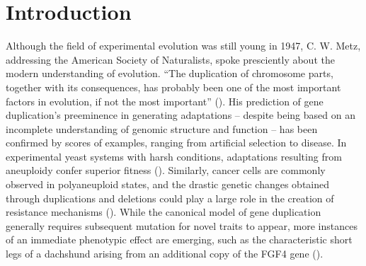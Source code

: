\section{Introduction} \label{sec:introduction}

Although the field of experimental evolution was still young in 1947, C. W. Metz, addressing the American Society of Naturalists, spoke presciently about the modern understanding of evolution. ``The duplication of chromosome parts, together with its consequences, has probably been one of the most important factors in evolution, if not the most important'' (\citep{Metz:chromosomeDuplication1947}).
His prediction of gene duplication's preeminence in generating adaptations -- despite being based on an incomplete understanding of genomic structure and function -- has been confirmed by scores of examples, ranging from artificial selection to disease. In experimental yeast systems with harsh conditions, adaptations resulting from aneuploidy confer superior fitness (\citep{Pavelka:2010}). Similarly, cancer cells are commonly observed in polyaneuploid states, and the drastic genetic changes obtained through duplications and deletions could play a large role in the creation of resistance mechanisms (\citep{polyaneuploidCancer}). While the canonical model of gene duplication generally requires subsequent mutation for novel traits to appear, more instances of an immediate phenotypic effect are emerging, such as the characteristic short legs of a dachshund arising from an additional copy of the FGF4 gene (\citep{ohno1970evolution,dachshundGeneCopyNum}).



